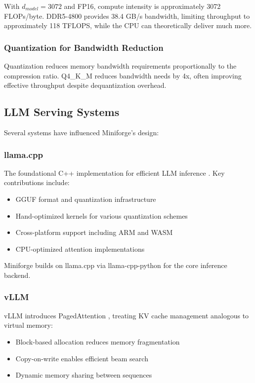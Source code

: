 With $d_{model} = 3072$ and FP16, compute intensity is approximately 3072 FLOPs/byte. DDR5-4800 provides 38.4 GB/s bandwidth, limiting throughput to approximately 118 TFLOPS, while the CPU can theoretically deliver much more.

\subsubsection{Quantization for Bandwidth Reduction}

Quantization reduces memory bandwidth requirements proportionally to the compression ratio. Q4\_K\_M reduces bandwidth needs by 4x, often improving effective throughput despite dequantization overhead.

\subsection{LLM Serving Systems}

Several systems have influenced Miniforge's design:

\subsubsection{llama.cpp}

The foundational C++ implementation for efficient LLM inference \cite{ggerganov2023llama}. Key contributions include:

\begin{itemize}
    \item GGUF format and quantization infrastructure
    \item Hand-optimized kernels for various quantization schemes
    \item Cross-platform support including ARM and WASM
    \item CPU-optimized attention implementations
\end{itemize}

Miniforge builds on llama.cpp via llama-cpp-python for the core inference backend.

\subsubsection{vLLM}

vLLM introduces PagedAttention \cite{kwon2023efficient}, treating KV cache management analogous to virtual memory:

\begin{itemize}
    \item Block-based allocation reduces memory fragmentation
    \item Copy-on-write enables efficient beam search
    \item Dynamic memory sharing between sequences
\end{itemize}

